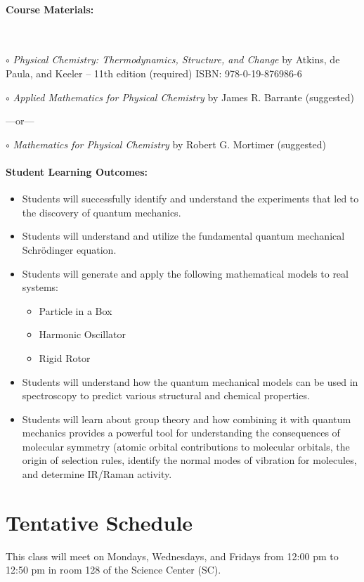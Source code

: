 \documentclass[12pt, letterpaper]{article}
\begin{document}
\paragraph{Course Materials:} ~

$\circ$ \emph{Physical Chemistry: Thermodynamics, Structure, and Change} by Atkins, de Paula, and Keeler -- 11th edition (required) ISBN: 978-0-19-876986-6

$\circ$ \emph{Applied Mathematics for Physical Chemistry} by James R. Barrante (suggested)

\vspace{-4pt}
---or---

\vspace{-4pt}
$\circ$ \emph{Mathematics for Physical Chemistry} by Robert G. Mortimer (suggested)

\paragraph{Student Learning Outcomes:}
\begin{itemize}
	\item{Students will successfully identify and understand the experiments that led to the discovery of quantum mechanics.}
	\item{Students will understand and utilize the fundamental quantum mechanical Schrödinger equation.}
	\item{Students will generate and apply the following mathematical models to real systems:}
	\begin{itemize}
		\item{Particle in a Box}
		\item{Harmonic Oscillator}
		\item{Rigid Rotor}
	\end{itemize}
	\item{Students will understand how the quantum mechanical models can be used in spectroscopy to predict various structural and chemical properties.}
	\item{Students will learn about group theory and how combining it with quantum mechanics provides a powerful tool for understanding the consequences of molecular symmetry (atomic orbital contributions to molecular orbitals, the origin of selection rules, identify the normal modes of vibration for molecules, and determine IR/Raman activity.}
\end{itemize}

\section*{Tentative Schedule}
This class will meet on Mondays, Wednesdays, and Fridays from 12:00 pm to 12:50 pm in room 128 of the Science Center (SC).
\end{document}
